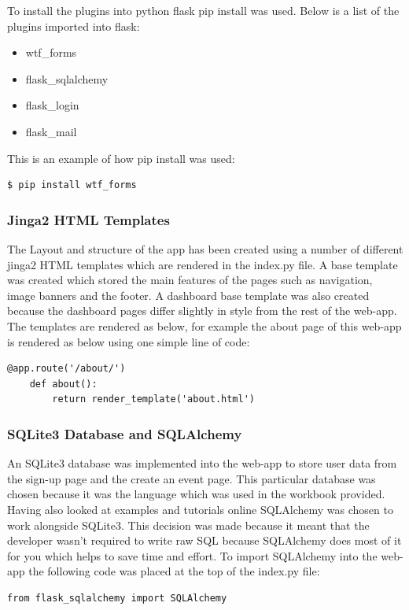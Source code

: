\documentclass[10pt, a4paper]{article}
\begin{document}
	To install the plugins into python flask pip install was used. Below is a list of the plugins imported into flask:\begin{itemize}
        \item wtf\_forms
 	    \item flask\_sqlalchemy
 		\item flask\_login
 		\item flask\_mail
 		\end{itemize}
 		
 	This is an example of how pip install was used:
 	\begin{lstlisting}[language=Python]
 	$ pip install wtf_forms
 	\end{lstlisting}
 	
    \subsubsection{Jinga2 HTML Templates}
    The Layout and structure of the app has been created using a number of different jinga2 HTML templates which are rendered in the index.py file. A base template was created which stored the main features of the pages such as navigation, image banners and the footer. A dashboard base template was also created because the dashboard pages differ slightly in style from the rest of the web-app. The templates are rendered as below, for example the about page of this web-app is rendered as below using one simple line of code: 
    \begin{lstlisting}[caption = Render Template Example]
    @app.route('/about/')
    def about():
        return render_template('about.html')
    \end{lstlisting}
    
    \subsubsection{SQLite3 Database and SQLAlchemy}
    An SQLite3 database was implemented into the web-app to store user data from the sign-up page and the create an event page. This particular database was chosen because it was the language which was used in the workbook provided. Having also looked at examples and tutorials online SQLAlchemy was chosen to work alongside SQLite3. This decision was made because it meant that the developer wasn't required to write raw SQL because SQLAlchemy does most of it for you which helps to save time and effort. To import SQLAlchemy into the web-app the following code was placed at the top of the index.py file:
    \begin{lstlisting}[caption = Import SQLAlchemy into web-app]
    from flask_sqlalchemy import SQLAlchemy\end{lstlisting}
    
\end{document}
